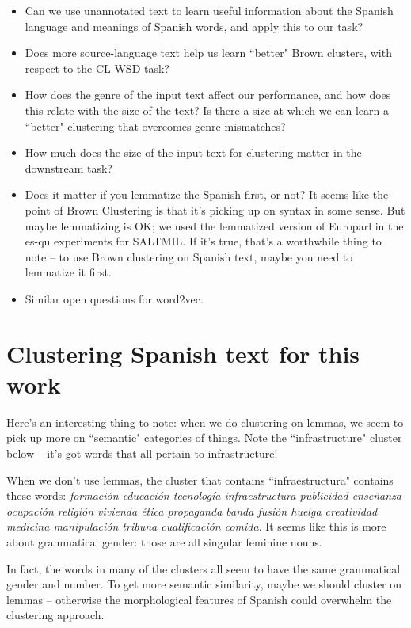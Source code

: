 \begin{itemize}
  \item Can we use unannotated text to learn useful information about the
  Spanish language and meanings of Spanish words, and apply this to our task?
  \item Does more source-language text help us learn ``better" Brown clusters,
    with respect to the CL-WSD task?
  \item How does the genre of the input text affect our performance, and how
  does this relate with the size of the text? Is there a size at which we
    can learn a ``better" clustering that overcomes genre mismatches?
  \item How much does the size of the input text for clustering matter in the
  downstream task?
  \item Does it matter if you lemmatize the Spanish first, or not? It seems
    like the point of Brown Clustering is that it's picking up on syntax in
    some sense. But maybe lemmatizing is OK; we used the lemmatized version of
    Europarl in the es-qu experiments for SALTMIL. If it's true, that's a
    worthwhile thing to note -- to use Brown clustering on Spanish text, maybe
    you need to lemmatize it first.
  \item Similar open questions for word2vec.
\end{itemize}


\section{Clustering Spanish text for this work}


Here's an interesting thing to note: when we do clustering on lemmas, we seem
to pick up more on ``semantic" categories of things. Note the ``infrastructure"
cluster below -- it's got words that all pertain to infrastructure!

When we don't use lemmas, the cluster that contains ``infraestructura" contains
these words: \emph{formación educación tecnología infraestructura publicidad
enseñanza ocupación religión vivienda ética propaganda banda fusión huelga
creatividad medicina manipulación tribuna cualificación comida}. It seems like
this is more about grammatical gender: those are all singular feminine nouns.

In fact, the words in many of the clusters all seem to have the same
grammatical gender and number. To get more semantic similarity, maybe we should
cluster on lemmas -- otherwise the morphological features of Spanish could
overwhelm the clustering approach.


